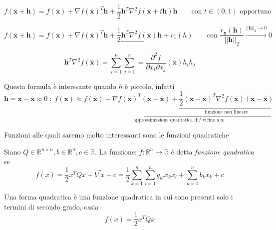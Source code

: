 \begin{defn}
 $$f(\overline{\mathbf{x}}+\mathbf{h}) = f(\overline{\mathbf{x}}) +
 \nabla f(\overline{\mathbf{x}})^T\mathbf{h} + 
 \frac{1}{2}  \mathbf{h}^T \nabla^{2} f(\overline{\mathbf{x}} +
 t  \mathbf{h}) \mathbf{h}
\qquad
\text{con } t \in (0,1) \text{ opportuno}
$$
\end{defn}

\begin{defn}
 $$f(\overline{\mathbf{x}}+\mathbf{h}) = 
f(\overline{\mathbf{x}}) +
 \nabla f(\overline{\mathbf{x}})^T\mathbf{h} + 
 \frac{1}{2} 
\underbracket{ \mathbf{h}^T \nabla^{2} f(\overline{\mathbf{x}}) \mathbf{h}}_{}
+ r_{\overline{x}}(h)
\qquad
\text{con } \dfrac{r_{\overline{\mathbf{x}}}(\mathbf{h})}{||\mathbf{h}||_{2}}
\xrightarrow{||\mathbf{h}||_{2} \to 0} 0
$$

$$\mathbf{h}^{T} \nabla^{2} f(\overline{\mathbf{x}}) =
 \displaystyle \sum_{i=1}^{n} \displaystyle \sum_{j=1}^{n}
 = \frac{{\partial}^2 f}
{{\partial} x_i {\partial} x_j}
(\overline{\mathbf{x}}) h_i h_j$$
\end{defn}
Questa formula è interssante quando $h$ è piccolo, infatti
$$ 
\mathbf{h} = \mathbf{x} - \overline{\mathbf{x}} \approx 0
\; : \;
f(\mathbf{x}) \approx
\underbracket{ f(\overline{\mathbf{x}}) + \nabla f(\overline{\mathbf{x}})^{T} (\mathbf{x}-\overline{\mathbf{x}}) + 
 \underbracket{\frac{1}{2}(\mathbf{x}- \overline{\mathbf{x}})^{T}\nabla^{2} f(\overline{\mathbf{x}})(\mathbf{x}-\overline{\mathbf{x}})}_{\text{funzione non lineare}}}_{\text{approssimazione quadratica di} f  \text{ vicino a } \mathbf{x}} $$

Funzioni alle quali saremo molto interessanti sono le funzioni quadratiche
\begin{defn}
Siano $ Q \in \mathbb{R}^{n \times n}, b \in \mathbb{R}^{n}, c \in \mathbb{R} $.
La funzione: $f: \mathbb{R}^{n} \rightarrow \mathbb{R}$ \`e detta
\emph{funzione quadratica} se 
 $$ 
f(x) =  \frac{1}{2} x^{T} Q x + b^{T}x + c 
=
\frac{1}{2} 
 \displaystyle \sum_{k=1}^{n} \displaystyle \sum_{l=1}^{n}
q_{kl} x_{k}x_{l} + \displaystyle \sum_{k=1}^{n} b_k x_k + c
$$
\end{defn}

\begin{notes}
Una forma quadratica \`e una funzione quadratica in cui
sono presenti solo i termini di secondo grado, ossia
$$f(x) =  \frac{1}{2} x^{T} Q x $$
\end{notes}


